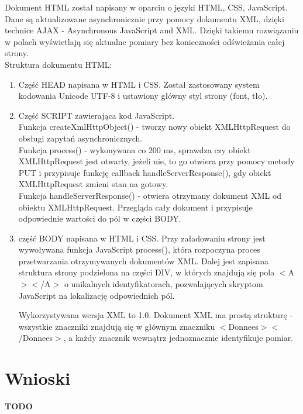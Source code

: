 \documentclass[a4paper,12pt,twoside,openany]{report}
\newcommand{\TODO}{\textbf{TODO}}
\begin{document}
Dokument HTML został napisany w oparciu o języki HTML, CSS, JavaScript. Dane są aktualizowane asynchronicznie przy pomocy dokumentu XML, dzięki technice AJAX - Asynchronous JavaScript and XML. Dzięki takiemu rozwiązaniu w polach wyświetlają się aktualne pomiary bez konieczności odświeżania całej strony. \\
Struktura dokumentu HTML:
\begin{enumerate}
\item Część HEAD napisana w HTML i CSS. Został zastosowany system kodowania Unicode UTF-8 i ustawiony główny styl strony (font, tło).
\item Część SCRIPT zawierająca kod JavaScript.\\
Funkcja createXmlHttpObject() - tworzy nowy obiekt XMLHttpRequest do obsługi zapytań asynchronicznych.\\
Funkcja process() - wykonywana co 200 ms, sprawdza czy obiekt XMLHttpRequest jest otwarty, jeżeli nie, to go otwiera przy pomocy metody PUT i przypisuje funkcję callback handleServerResponse(), gdy obiekt XMLHttpRequest zmieni stan na gotowy.\\
Funkcja handleServerResponse() - otwiera otrzymany dokument XML od obiektu XMLHttpRequest. Przegląda cały dokument i przypisuje odpowiednie wartości do pól w części BODY.
\item część BODY napisana w HTML i CSS. Przy załadowaniu strony jest wywoływana funkcja JavaScript process(), która rozpoczyna proces przetwarzania otrzymywanych dokumentów XML. Dalej jest zapisana struktura strony podzielona na części DIV, w których znajdują się pola $<$A$>$$<$/A$>$ o unikalnych identyfikatorach, pozwalających skryptom JavaScript na lokalizację odpowiednich pól.

Wykorzystywana wersja XML to 1.0. Dokument XML ma prostą strukturę - wszystkie znaczniki znajdują się w głównym znaczniku $<$Donnees$>$$<$/Donnees$>$, a każdy znacznik wewnątrz jednoznacznie identyfikuje pomiar.

\end{enumerate}

\chapter{Wnioski}

\TODO
\end{document}
